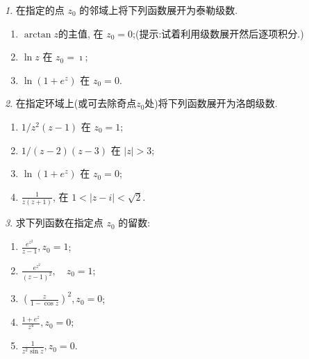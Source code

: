 \documentclass[11pt]{article}
\theoremstyle{remark}
\newtheorem{problem}{}
\begin{document}
\renewcommand{\labelenumi}{(\arabic{enumi})}
\renewcommand{\labelenumii}{(\arabic{enumi}.\arabic{enumii})}



 

\begin{problem}
  在指定的点 $z_0$ 的邻域上将下列函数展开为泰勒级数.
  \begin{enumerate}
    \item $\arctan z$的主值, 在 $z_0=0$;(提示:试着利用级数展开然后逐项积分.)
    \item $\ln z$ 在 $z_0=\imath$;
    \item $\ln \left(1+e^z\right)$ 在 $z_0=0$.
  \end{enumerate}
\end{problem}

\begin{problem}
  在指定环域上(或可去除奇点$z_0$处)将下列函数展开为洛朗级数.
  \begin{enumerate}
    \item$1 / z^2(z-1)$ 在 $z_0=1$;
    \item $1 /(z-2)(z-3)$ 在 $|z|>3$;
    \item $\ln \left(1+e^z\right)$ 在 $z_0=0$;
    \item $\frac{1}{z(z+1)}$, 在 $1<|z-i|<\sqrt{2}$.
  \end{enumerate}
\end{problem}

\begin{problem}
 求下列函数在指定点 $z_0$ 的留数:

 \begin{enumerate}
  \item  $\frac{e^{z^2}}{z-1}, z_0=1$;
  \item $\frac{e^{z^2}}{(z-1)^2}, \quad z_0=1$;
  \item $\left(\frac{z}{1-\cos z}\right)^2, z_0=0$;
  \item  $\frac{1+e^z}{z^4}, z_0=0$;
  \item $\frac{1}{z^2 \sin z}, z_0=0$.
 \end{enumerate}

\end{problem}
\end{document}
